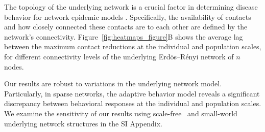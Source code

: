 \documentclass[9pt,twocolumn,twoside]{pnas-new}
\begin{document}
The topology of the underlying network is a crucial factor in determining disease behavior for network epidemic models \cite{Ganesh05,Perez22,Meyers07}. 
%
%
%
%
Specifically, the availability of contacts and how closely connected these contacts are to each other are defined by the network's connectivity.
%
Figure~\ref{fig:heatmaps_figure}B shows the average lag between the maximum contact reductions at the individual and population scales, for different connectivity levels of the underlying Erd\"{o}s–R\'{e}nyi network of $n$ nodes.

%
Our results are robust to variations in the underlying network model. Particularly, in sparse networks, 
the adaptive behavior model reveals a significant discrepancy between behavioral responses at the individual and population scales.
We examine the sensitivity of our results using scale-free~\cite{Barabasi99} and small-world~\cite {Strogatz98} underlying network structures in the SI Appendix.
\end{document}
